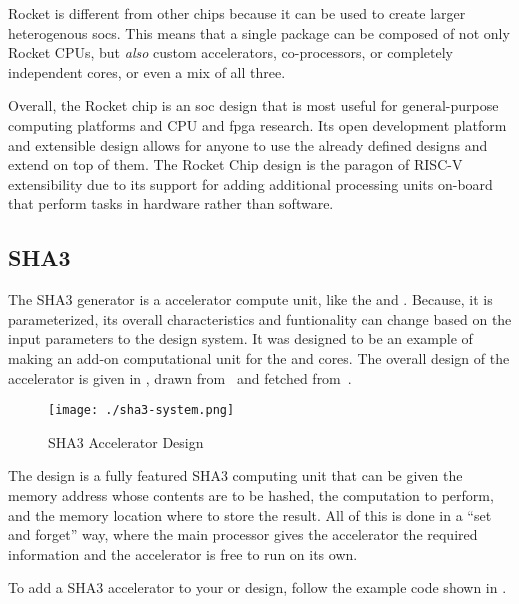 Rocket is different from other chips because it can be used to create larger heterogenous \glspl{soc}.
This means that a single package can be composed of not only Rocket CPUs, but \emph{also} custom \glspl{accelerator}, co-processors, or completely independent cores, or even a mix of all three.

Overall, the Rocket chip is an \gls{soc} design that is most useful for general-purpose computing platforms and CPU and \gls{fpga} research.
Its open development platform and \gls{extensible} design allows for anyone to use the already defined designs and extend on top of them.
The Rocket Chip design is the paragon of RISC-V extensibility due to its support for adding additional processing units on-board that perform tasks in hardware rather than software.

\subsection{SHA3}\label{sec:SHA3_Accelerators_Generator}
\nocite{sha3Paper}
\nocite{sha3Github}
The SHA3 generator is a  \gls{accelerator} compute unit, like the  and .
Because, it is parameterized, its overall characteristics and funtionality can change based on the input parameters to the design system.
It was designed to be an example of making an add-on computational unit for the  and  cores.
The overall design of the \gls{accelerator} is given in , drawn from~\cite{sha3Paper} and fetched from~\cite{sha3Github}.

\begin{figure}[h!tbp]
  \centering
  \texttt{[image: ./sha3-system.png]}
  \caption{SHA3 Accelerator Design~\cite[p.~3]{sha3Paper}}
  \label{fig:SHA3_Accelerator_Design}
\end{figure}

The design is a fully featured SHA3 computing unit that can be given the memory address whose contents are to be hashed, the computation to perform, and the memory location where to store the result.
All of this is done in a ``set and forget'' way, where the main processor gives the \gls{accelerator} the required information and the accelerator is free to run on its own.

To add a SHA3 accelerator to your  or  design, follow the example code shown in .

